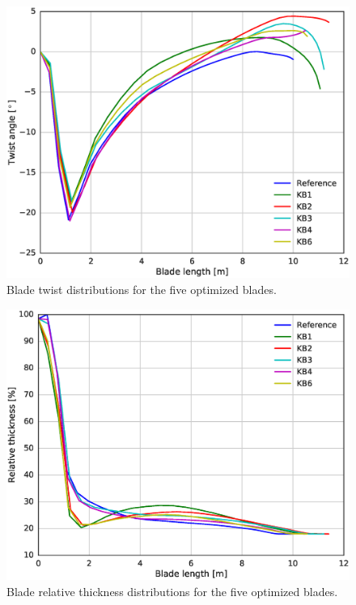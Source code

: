 \begin{figure}[pht]
\begin{center}
	\includegraphics[width=.85\linewidth]{figures/KBcomp_twist.eps}
\end{center}
\caption{Blade twist distributions for the five optimized blades.}
\label{fig:twist}
\end{figure}

\begin{figure}[pht]
\begin{center}
	\includegraphics[width=.85\linewidth]{figures/KBcomp_rthick.eps}
\end{center}
\caption{Blade relative thickness distributions for the five optimized blades.}
\label{fig:rthick}
\end{figure}


